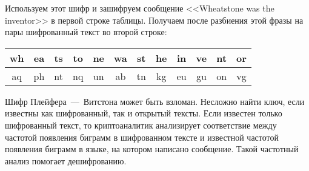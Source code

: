 \example
Используем этот шифр и зашифруем сообщение <<Wheatstone was the inventor>> в первой строке таблицы. Получаем после разбиения этой фразы на пары шифрованный текст во второй строке:
\begin{center} \begin{tabular}{|*{12}c|}
    \hline
    wh & ea & ts & to & ne & wa & st & he & in & ve & nt & or \\
    \hline
    aq & ph & nt & nq & un & ab & tn & kg & eu & gu & on & vg \\
    \hline
\end{tabular} \end{center}
\exampleend

Шифр Плейфера~---~Витстона может быть взломан. Несложно найти ключ, если известны как шифрованный, так и открытый тексты. Если известен только шифрованный текст, то криптоаналитик анализирует соответствие между частотой появления биграмм в шифрованном тексте и известной частотой появления биграмм в языке, на котором написано сообщение. Такой частотный анализ помогает дешифрованию.
